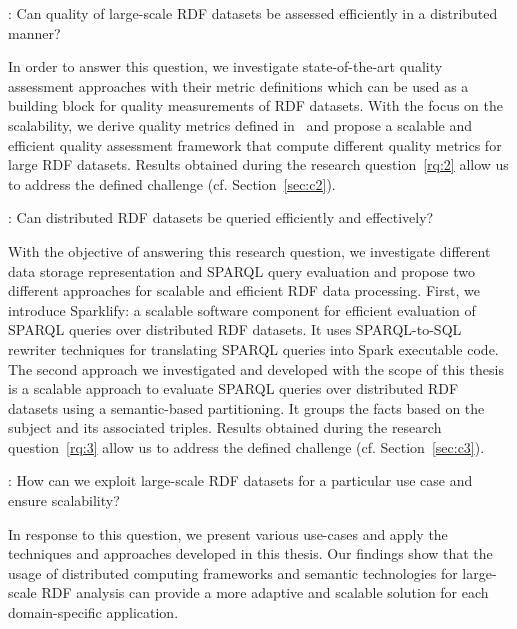 \begin{tcolorbox}
\textbf{\rqNr[RQ2]\label{rq:2}}: Can quality of large-scale \gls{RDF} datasets be assessed efficiently in a distributed manner?
\end{tcolorbox}

In order to answer this question, we investigate state-of-the-art quality assessment approaches with their metric definitions which can be used as a building block for quality measurements of \gls{RDF} datasets.
With the focus on the scalability, we derive quality metrics defined in~\cite{zaveri2015quality} and propose a scalable and efficient quality assessment framework that compute different quality metrics for large \gls{RDF} datasets.
Results obtained during the research question~\ref{rq:2} allow us to address the defined challenge (cf. Section~\ref{sec:c2}).

\begin{tcolorbox}
\textbf{\rqNr[RQ3]\label{rq:3}}: Can distributed \gls{RDF} datasets be queried efficiently and effectively?
\end{tcolorbox}

With the objective of answering this research question, we investigate different data storage representation and \gls{SPARQL} query evaluation and propose two different approaches for scalable and efficient \gls{RDF} data processing.
First, we introduce Sparklify: a scalable software component for efficient evaluation of \gls{SPARQL} queries over distributed \gls{RDF} datasets.
It uses SPARQL-to-SQL rewriter techniques for translating \gls{SPARQL} queries into Spark executable code.
The second approach we investigated and developed with the scope of this thesis is a scalable approach to evaluate \gls{SPARQL} queries over distributed \gls{RDF} datasets using a semantic-based partitioning.
It groups the facts based on the subject and its associated triples.
Results obtained during the research question~\ref{rq:3} allow us to address the defined challenge (cf. Section~\ref{sec:c3}). 

\begin{tcolorbox}
\textbf{\rqNr[RQ4]\label{rq:4}}: How can we exploit large-scale \gls{RDF} datasets for a particular use case and ensure scalability?
\end{tcolorbox}

In response to this question, we present various use-cases and apply the techniques and approaches developed in this thesis.
Our findings show that the usage of distributed computing frameworks and semantic technologies for large-scale \gls{RDF} analysis can provide a more adaptive and scalable solution for each domain-specific application.

